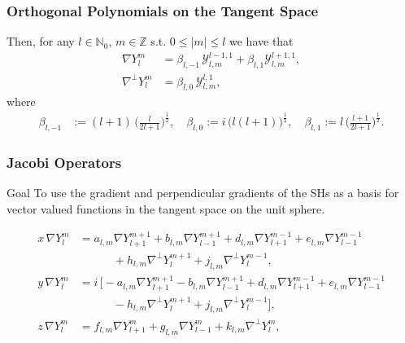 \documentclass[10pt]{beamer}
\newcommand{\half}{\frac{1}{2}}
\newcommand{\Z}{\mathbb{Z}}
\newcommand{\No}{\mathbb{N}_0}
\newcommand{\Ylm}{Y^m_l}
\newcommand{\gradY}{\nabla Y}
\newcommand{\gradYlm}{\nabla Y^m_l}
\newcommand{\gradpY}{\nabla^\perp Y}
\newcommand{\curlyy}{\bm{\mathcal{Y}}}
\newcommand{\blone}{\beta_{l, 1}}
\newcommand{\blzero}{\beta_{l, 0}}
\newcommand{\blmone}{\beta_{l, -1}}
\newcommand{\alm}{a_{l,m}}
\newcommand{\blm}{b_{l,m}}
\newcommand{\dlm}{d_{l,m}}
\newcommand{\elm}{e_{l,m}}
\newcommand{\flm}{f_{l,m}}
\newcommand{\glm}{g_{l,m}}
\newcommand{\hlm}{h_{l,m}}
\newcommand{\jlm}{j_{l,m}}
\newcommand{\klm}{k_{l,m}}
\begin{document}
\frame
{
    \frametitle{Orthogonal Polynomials on the Tangent Space}

Then, for any \(l \in \No\), \(m \in \Z\) s.t. \(0 \le |m| \le l\) we have that
\begin{align}
\nabla \Ylm &= \blmone \, \curlyy^{l-1,1}_{l,m} + \blone \curlyy^{l+1,1}_{l,m}, \\
\nabla^\perp \Ylm &= \blzero \, \curlyy^{l,1}_{l,m},
\end{align}
where
\begin{align}
\blmone &:= (l+1) \, \Big(\frac{l}{2l+1}\Big)^\half, \quad
\blzero := i \, \big(l(l+1)\big)^\half, \quad
\blone := l \, \Big(\frac{l+1}{2l+1}\Big)^\half.
\end{align}

}

\frame
{
    \frametitle{Jacobi Operators}
    
\begin{block}{Goal}
To use the gradient and perpendicular gradients of the SHs as a basis for vector valued functions in the tangent space on the unit sphere.
\end{block}

\begin{align}
x \,\gradYlm &= \alm \gradY^{m+1}_{l+1} + \blm \gradY^{m+1}_{l-1} + \dlm \gradY^{m-1}_{l+1} + \elm \gradY^{m-1}_{l-1} \nonumber \\
& \quad \quad \quad + \hlm \gradpY^{m+1}_{l} + \jlm \gradpY^{m-1}_{l}, \\
y \,\gradYlm &= i \, \Big[ -\alm \gradY^{m+1}_{l+1} - \blm \gradY^{m+1}_{l-1} + \dlm \gradY^{m-1}_{l+1} + \elm \gradY^{m-1}_{l-1} \nonumber \\
& \quad \quad \quad - \hlm \gradpY^{m+1}_{l} + \jlm \gradpY^{m-1}_{l} \Big], \\
z \,\gradYlm &= \flm \gradY^{m}_{l+1} + \glm \gradY^{m}_{l-1} + \klm \gradpY^{m}_{l},
\end{align}
    
}
\end{document}
